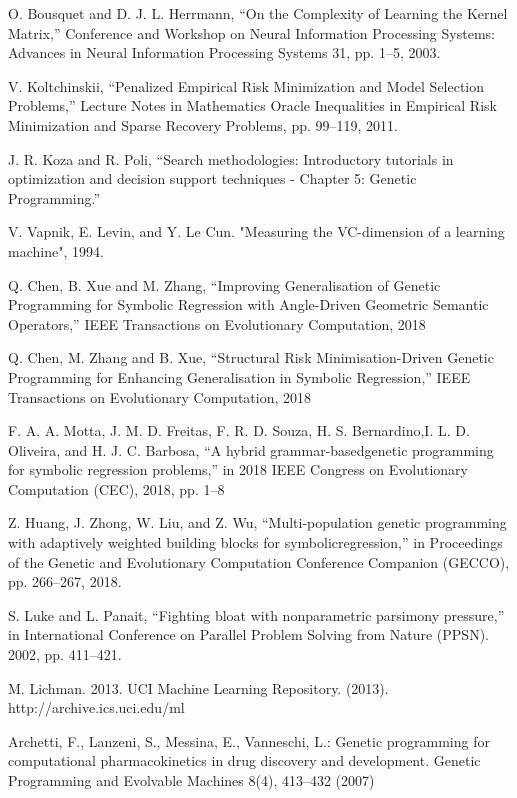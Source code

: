 \documentclass[conference]{IEEEtran}
\begin{document}
\begin{thebibliography}{00}
 O. Bousquet and D. J. L. Herrmann, “On the Complexity of Learning the Kernel Matrix,” Conference and Workshop on Neural Information Processing Systems: Advances in Neural Information Processing Systems 31, pp. 1--5, 2003. 

 V. Koltchinskii, “Penalized Empirical Risk Minimization and Model Selection Problems,” Lecture Notes in Mathematics Oracle Inequalities in Empirical Risk Minimization and Sparse Recovery Problems, pp. 99–119, 2011.

 J. R. Koza and R. Poli, “Search methodologies: Introductory tutorials in optimization and decision support techniques - Chapter 5: Genetic Programming.”

 V. Vapnik, E. Levin, and Y. Le Cun. "Measuring the VC-dimension of a learning machine", 1994.

 Q. Chen, B. Xue and M. Zhang, “Improving Generalisation of Genetic Programming for Symbolic Regression with Angle-Driven Geometric Semantic Operators,” IEEE Transactions on Evolutionary Computation, 2018

 Q. Chen, M. Zhang and B. Xue, “Structural Risk Minimisation-Driven Genetic Programming for Enhancing Generalisation in Symbolic Regression,” IEEE Transactions on Evolutionary Computation, 2018

 F.  A.  A.  Motta,  J.  M.  D.  Freitas,  F.  R.  D.  Souza,  H.  S.  Bernardino,I.  L.  D.  Oliveira,  and  H.  J.  C.  Barbosa,  “A  hybrid  grammar-basedgenetic programming for symbolic regression problems,” in 2018 IEEE Congress on Evolutionary Computation (CEC), 2018, pp. 1--8

 Z.  Huang,  J.  Zhong,  W.  Liu,  and  Z.  Wu,  “Multi-population  genetic programming  with  adaptively  weighted  building  blocks  for  symbolicregression,” in Proceedings of the Genetic and Evolutionary Computation Conference Companion (GECCO), pp. 266--267, 2018.

 S. Luke and L. Panait, “Fighting bloat with nonparametric parsimony pressure,” in International Conference on Parallel Problem Solving from Nature (PPSN). 2002, pp. 411--421.

 M. Lichman. 2013. UCI Machine Learning Repository. (2013). http://archive.ics.uci.edu/ml 

 Archetti, F., Lanzeni, S., Messina, E., Vanneschi, L.: Genetic programming for computational pharmacokinetics in drug discovery and development. Genetic Programming and Evolvable Machines 8(4), 413–432 (2007)


\end{thebibliography}
\end{document}
